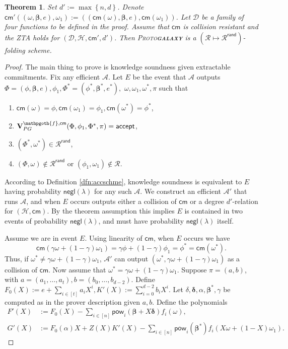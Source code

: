 \documentclass[11pt]{article} %
\newcommand{\protogal}{{\normalfont\scshape Proto\bfseries{galaxy}}\xspace}
\newcommand{\adv}{\ensuremath{\mathcal A}\xspace}
\newcommand{\advprime}{\ensuremath{\mathcal{A}'}\xspace}
\newcommand{\cm}{\ensuremath{\mathsf{cm}}\xspace}
\newcommand{\negl}{\ensuremath{\mathsf{negl}(\lambda)}\xspace}
\newcommand{\accept}{\ensuremath{\mathsf{accept}}\xspace}
\newcommand{\defeq}{:=}
\newcommand{\hash}{\ensuremath{\mathcal{H}}\xspace}
\newcommand{\prf}{\ensuremath{\mathsf{\pi}}\xspace}
\newcommand{\inst}{\ensuremath{\phi}\xspace}
\newcommand{\wit}{\ensuremath{\mathsf{\omega}}\xspace}
\newcommand{\ver}{\ensuremath{\mathsf{\mathbf{V}}}\xspace}
\newcommand{\verpg}{\ensuremath{\ver^{\predinst,\cm}_{PG}}\xspace}
\newcommand{\rel}{\ensuremath{\mathcal{R}}\xspace}
\newcommand{\relrand}{\ensuremath{\mathcal{R^{\mathsf{rand}}}}\xspace}
\newcommand{\set}[1]{\ensuremath{\left\{#1\right\}}\xspace}
\newtheorem{thm}[lemma]{Theorem}
\newcommand{\betaa}{\ensuremath{\mathbf{\boldsymbol{\beta}}}\xspace}
\newcommand{\deltaa}{\ensuremath{\mathbf{\boldsymbol{\delta}}}\xspace}
\newcommand{\instt}{\ensuremath{\Phi^*}\xspace}
\newcommand{\insttbase}{\ensuremath{\Phi}\xspace}
\newcommand{\pow}{\ensuremath{\mathsf{pow}}\xspace}
\newcommand{\accscheme}[2]{$(#1\mapsto #2)$-folding scheme\xspace}
\newcommand{\inststar}{\ensuremath{\inst^*}\xspace}
\newcommand{\witstar}{\ensuremath{\wit^*}\xspace}
\newcommand{\predinst}{\ensuremath{\mathpgoth{f}}\xspace}
\newcommand{\ztafuncs}{\ensuremath{\mathcal{D}}\xspace}
\begin{document}
\begin{thm}\label{thm:pgsoundness}
Set $d'\defeq \max \set{n,d}$. Denote $\cm'((\wit,\betaa,e),\wit_1)\defeq ((\cm(\wit),\betaa,e),\cm(\wit_1))$.
Let \ztafuncs be a family of four functions to be defined in the proof.
Assume that \cm is collision resistant and the ZTA holds for $(\ztafuncs,\hash, \cm',d')$.
Then \protogal is a \accscheme{\rel}{\relrand}.
\end{thm}
\begin{proof}
The main thing to prove is knowledge soundness given extractable commitments.
 Fix any efficient \adv. Let $E$ be the event that \adv outputs
$\insttbase=(\inst,\betaa,e),\inst_1,\instt=(\inststar,\betaa^*,e^*),$ $\wit,\wit_1,\witstar,\prf$ such that
\begin{enumerate}
\item $\cm(\wit)=\inst,\cm(\wit_1)=\inst_1,\cm(\witstar)=\inststar$,
\item $\verpg(\insttbase,\inst_1,\instt,\prf)=\accept$,
\item $(\instt,\witstar)\in\relrand$,
\item $(\insttbase,\wit)\notin\relrand$ or $(\inst_1,\wit_1)\notin \rel$.
\end{enumerate}
According to Definition \ref{dfn:accschme}, knowledge soundness is equivalent to $E$ having
probability \negl for any such \adv.
We construct an efficient \advprime that runs \adv, and when $E$ occurs outputs either a collision of
\cm or a degree $d'$-relation for $(\hash,\cm)$. By the theorem assumption this implies $E$ is contained in two events of
probability \negl, and must have probability \negl itself.

Assume we are in event $E$.
Using linearity of \cm, when $E$ occurs we have
\[\cm( \gamma\wit+(1-\gamma)\wit_1)=\gamma \inst +(1-\gamma)\inst_1=\inststar=\cm(\witstar).\]
Thus, if $\witstar \neq \gamma \wit + (1-\gamma)\wit_1$, \advprime can output $(\witstar,\gamma\wit+(1-\gamma)\wit_1)$
as a collision of \cm.
Now assume that $\witstar = \gamma \wit + (1-\gamma)\wit_1$.
Suppose $\prf=(a,b)$, with $a=(a_1,\ldots,a_t),b= (b_0,\ldots,b_{d-2})$.
Define $F_0(X)\defeq e+\sum_{i\in [t]} a_iX^i,K'(X)\defeq \sum_{i=0}^{d-2} b_iX^i$.
Let $\delta,\deltaa,\alpha,\betaa^*, \gamma$ be computed as in the prover description given $a,b$.
Define the polynomials
\begin{align*}
F'(X) &\defeq F_0(X)-\sum_{i\in [n]} \pow_i(\betaa+X\deltaa) f_i(\wit), \\
G'(X) &\defeq F_0(\alpha)X+ Z(X)K'(X)-\sum_{i\in [n]}\pow_i( \betaa^*) f_i(X\wit +(1-X)\wit_1).
\end{align*}


\end{proof}
\end{document}
